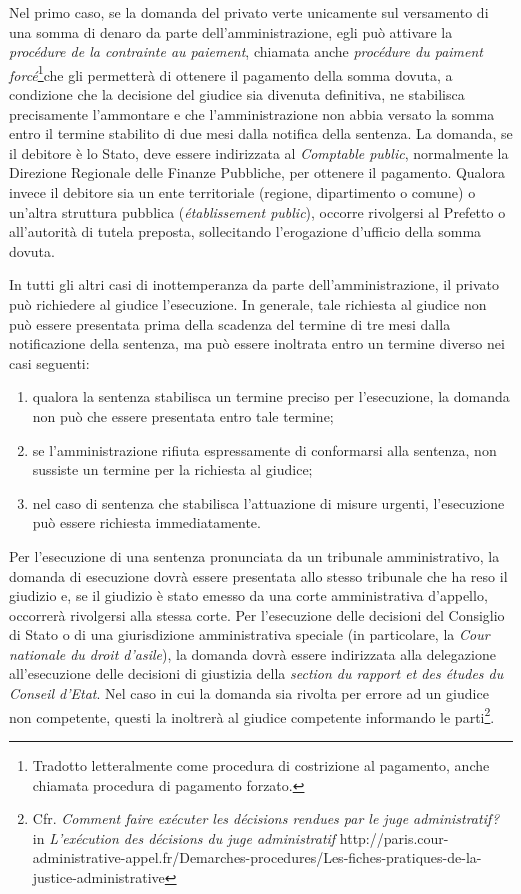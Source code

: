 \documentclass[12pt,it,a4paper,]{report}
\providecommand{\tightlist}{%
  \setlength{\itemsep}{0pt}\setlength{\parskip}{0pt}}
\begin{document}
Nel primo caso, se la domanda del privato verte unicamente sul
versamento di una somma di denaro da parte dell'amministrazione, egli
può attivare la \emph{procédure de la contrainte au paiement}, chiamata
anche \emph{procédure du paiment forcé}\footnote{Tradotto letteralmente
  come procedura di costrizione al pagamento, anche chiamata procedura
  di pagamento forzato.}che gli permetterà di ottenere il pagamento
della somma dovuta, a condizione che la decisione del giudice sia
divenuta definitiva, ne stabilisca precisamente l'ammontare e che
l'amministrazione non abbia versato la somma entro il termine stabilito
di due mesi dalla notifica della sentenza. La domanda, se il debitore è
lo Stato, deve essere indirizzata al \emph{Comptable public},
normalmente la Direzione Regionale delle Finanze Pubbliche, per ottenere
il pagamento. Qualora invece il debitore sia un ente territoriale
(regione, dipartimento o comune) o un'altra struttura pubblica
(\emph{établissement public}), occorre rivolgersi al Prefetto o
all'autorità di tutela preposta, sollecitando l'erogazione d'ufficio
della somma dovuta.

In tutti gli altri casi di inottemperanza da parte dell'amministrazione,
il privato può richiedere al giudice l'esecuzione. In generale, tale
richiesta al giudice non può essere presentata prima della scadenza del
termine di tre mesi dalla notificazione della sentenza, ma può essere
inoltrata entro un termine diverso nei casi seguenti:

\begin{enumerate}
\def\labelenumi{\arabic{enumi})}
\tightlist
\item
  qualora la sentenza stabilisca un termine preciso per l'esecuzione, la
  domanda non può che essere presentata entro tale termine;
\item
  se l'amministrazione rifiuta espressamente di conformarsi alla
  sentenza, non sussiste un termine per la richiesta al giudice;
\item
  nel caso di sentenza che stabilisca l'attuazione di misure urgenti,
  l'esecuzione può essere richiesta immediatamente.
\end{enumerate}

Per l'esecuzione di una sentenza pronunciata da un tribunale
amministrativo, la domanda di esecuzione dovrà essere presentata allo
stesso tribunale che ha reso il giudizio e, se il giudizio è stato
emesso da una corte amministrativa d'appello, occorrerà rivolgersi alla
stessa corte. Per l'esecuzione delle decisioni del Consiglio di Stato o
di una giurisdizione amministrativa speciale (in particolare, la
\emph{Cour nationale du droit d'asile}), la domanda dovrà essere
indirizzata alla delegazione all'esecuzione delle decisioni di giustizia
della \emph{section du rapport et des études du Conseil d'Etat}. Nel
caso in cui la domanda sia rivolta per errore ad un giudice non
competente, questi la inoltrerà al giudice competente informando le
parti\footnote{Cfr. \emph{Comment faire exécuter les décisions rendues
  par le juge administratif?} in \emph{L'exécution des décisions du juge
  administratif}
  http://paris.cour-administrative-appel.fr/Demarches-procedures/Les-fiches-pratiques-de-la-justice-administrative}.
\end{document}
